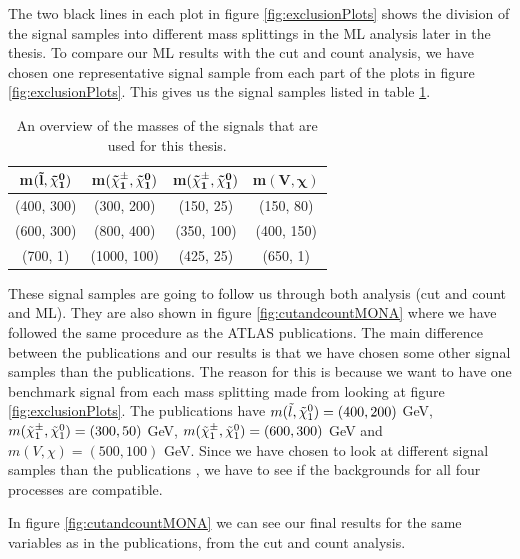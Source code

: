 The two black lines in each plot in figure \ref{fig:exclusionPlots} shows the division of the signal samples into different mass splittings in the ML analysis later in the thesis. To compare our ML results with the cut and count analysis, we have chosen one representative signal sample from each part of the plots in figure \ref{fig:exclusionPlots}. This gives us the signal samples listed in table \ref{tab:sigsampcutandcount}.

\begin{table}[H]
    \centering
    \begin{tabular}{c c c c}
    \toprule
    \textbf{m}$\mathbf{(\Tilde{l}, \Tilde{\chi}_1^0)}$ & \textbf{m}$\mathbf{(\Tilde{\chi}_1^\pm, \Tilde{\chi}_1^0)}$ & \textbf{m}$\mathbf{(\Tilde{\chi}_1^\pm, \Tilde{\chi}_1^0)}$ & \textbf{m}$\mathbf{( V, \chi)}$  \\
    \midrule
    \midrule
    (400, 300) & (300, 200) & (150, 25) & (150, 80)\\
    (600, 300) & (800, 400) & (350, 100) & (400, 150)\\
    (700, 1) & (1000, 100) & (425, 25) & (650, 1)\\
    \bottomrule
    \end{tabular}
    \caption{An overview of the masses of the signals that are used for this thesis.}
    \label{tab:sigsampcutandcount}
\end{table}

These signal samples are going to follow us through both analysis (cut and count and ML). They are also shown in figure \ref{fig:cutandcountMONA} where we have followed the same procedure as the ATLAS publications. The main difference between the publications and our results is that we have chosen some other signal samples than the publications. The reason for this is because we want to have one benchmark signal from each mass splitting made from looking at figure \ref{fig:exclusionPlots}. The publications have $m(\Tilde{l}, \Tilde{\chi}_1^0) = (400, 200)$ GeV, $m(\Tilde{\chi}_1^\pm, \Tilde{\chi}_1^0) = (300, 50)$ GeV, $m(\Tilde{\chi}_1^\pm, \Tilde{\chi}_1^0) = (600, 300)$ GeV and $m(V, \chi) = (500,100)$ GeV. Since we have chosen to look at different signal samples than the publications \cite{sleptonexclusion, monoZexclusion}, we have to see if the backgrounds for all four processes are compatible. 


In figure \ref{fig:cutandcountMONA} we can see our final results for the same variables as in the publications, from the cut and count analysis.

